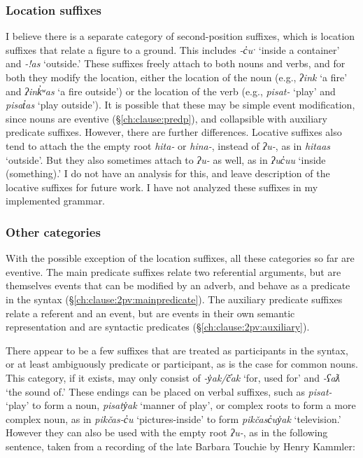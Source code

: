 \subsubsection{Location suffixes} \label{ch:clause:2pv:loc}

I believe there is a separate category of second-position suffixes, which is location suffixes that relate a figure to a ground. This includes \textit{-c̓uˑ} `inside a container' and \textit{-!as} `outside.' These suffixes freely attach to both nouns and verbs, and for both they modify the location, either the location of the noun (e.g., \textit{ʔink} `a fire' and \textit{ʔink̓ʷas} `a fire outside') or the location of the verb (e.g., \textit{pisat-} `play' and \textit{pisat̓as} `play outside'). It is possible that these may be simple event modification, since nouns are eventive (\S\ref{ch:clause:predp}), and collapsible with auxiliary predicate suffixes. However, there are further differences. Locative suffixes also tend to attach the the empty root \textit{hita-} or \textit{hina-}, instead of \textit{ʔu-}, as in \textit{hitaas} `outside'. But they also sometimes attach to \textit{ʔu-} as well, as in \textit{ʔuc̓uu} `inside (something).' I do not have an analysis for this, and leave description of the locative suffixes for future work. I have not analyzed these suffixes in my implemented grammar.

\subsubsection{Other categories} \label{ch:clause:2pv:additional}

With the possible exception of the location suffixes, all these categories so far are eventive. The main predicate suffixes relate two referential arguments, but are themselves events that can be modified by an adverb, and behave as a predicate in the syntax (\S\ref{ch:clause:2pv:mainpredicate}). The auxiliary predicate suffixes relate a referent and an event, but are events in their own semantic representation and are syntactic predicates (\S\ref{ch:clause:2pv:auxiliary}).

There appear to be a few suffixes that are treated as participants in the syntax, or at least ambiguously predicate or participant, as is the case for common nouns. This category, if it exists, may only consist of \textit{-y̓ak/č̓ak} `for, used for' and \textit{-ʕaƛ} `the sound of.' These endings can be placed on verbal suffixes, such as \textit{pisat-} `play' to form a noun, \textit{pisaty̓ak} `manner of play', or complex roots to form a more complex noun, as in \textit{pikčas-c̓u} `pictures-inside' to form \textit{pikčasc̓uy̓ak} `television.' However they can also be used with the empty root \textit{ʔu-}, as in the following sentence, taken from a recording of the late Barbara Touchie by Henry Kammler:

